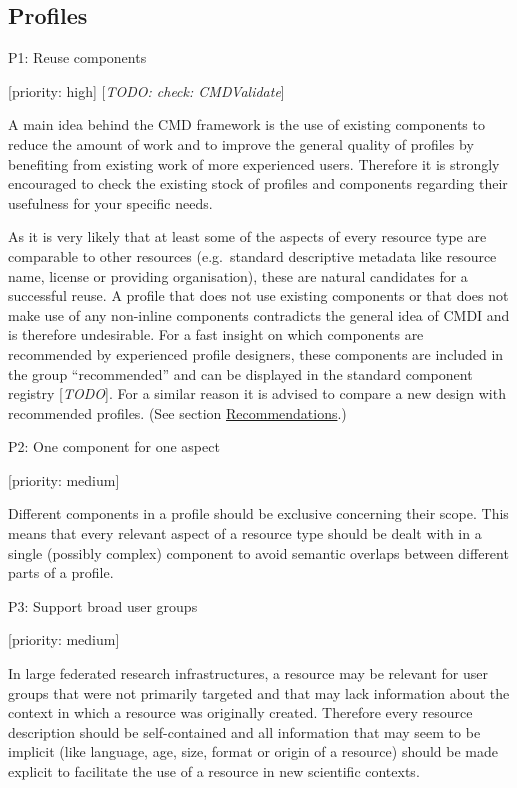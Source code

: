 \subsection{Profiles}\label{profiles}

P1: Reuse components

{[}priority: high{]} {[}\emph{TODO: check: CMDValidate}{]}

A main idea behind the CMD framework is the use of existing components
to reduce the amount of work and to improve the general quality of
profiles by benefiting from existing work of more experienced users.
Therefore it is strongly encouraged to check the existing stock of
profiles and components regarding their usefulness for your specific
needs.

As it is very likely that at least some of the aspects of every resource
type are comparable to other resources (e.g.~standard descriptive
metadata like resource name, license or providing organisation), these
are natural candidates for a successful reuse. A profile that does not
use existing components or that does not make use of any non-inline
components contradicts the general idea of CMDI and is therefore
undesirable. For a fast insight on which components are recommended by
experienced profile designers, these components are included in the
group ``recommended'' and can be displayed in the standard component
registry {[}\emph{TODO}{]}. For a similar reason it is advised to
compare a new design with recommended profiles. (See section
\href{/recommendations/README.md}{Recommendations}.)

P2: One component for one aspect

{[}priority: medium{]}

Different components in a profile should be exclusive concerning their
scope. This means that every relevant aspect of a resource type should
be dealt with in a single (possibly complex) component to avoid semantic
overlaps between different parts of a profile.

P3: Support broad user groups

{[}priority: medium{]}

In large federated research infrastructures, a resource may be relevant
for user groups that were not primarily targeted and that may lack
information about the context in which a resource was originally
created. Therefore every resource description should be self-contained
and all information that may seem to be implicit (like language, age,
size, format or origin of a resource) should be made explicit to
facilitate the use of a resource in new scientific contexts.

